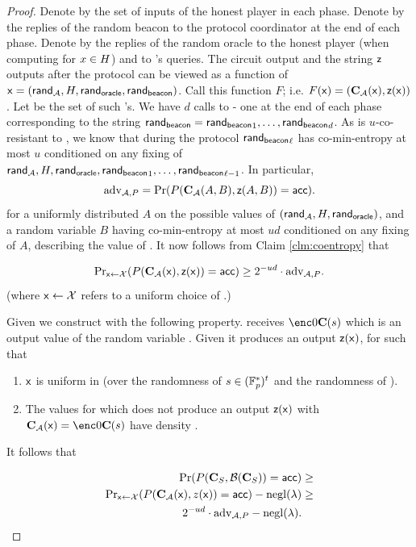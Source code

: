 \documentclass{article}
\begin{document}
\begin{proof}
Denote by \honestinputs the set of inputs of the honest player in each phase.
Denote by \beaconrand the replies of the random beacon to the protocol coordinator at the end of each phase.
Denote by \oraclerand the replies of the random oracle to the honest player (when computing  for $x\in H$) and to \adv 's queries.
The circuit output \protoutput and the string $\mathsf{z}$ \adv outputs after the protocol can be viewed as a function of $\mathsf{x}=(\mathsf{rand_{\mathcal{A}}},H,\mathsf{rand_{oracle}},\mathsf{rand_{beacon}})$.
Call this function $F$; i.e. $F(\mathsf{x}) = (\mathbf{C}_\mathcal{A}(\mathsf{x}),\mathsf{z}(\mathsf{x}))$.
Let \randdomain be the set of such \rand's.
We have $d$ calls to \RB - one at the end of each phase corresponding to the string $\mathsf{rand_{beacon}}= \mathsf{rand_{beacon}}_1,\ldots,\mathsf{rand_{beacon}}_d$. As \RB is $u$-co-resistant to \adv, we know that during the protocol
$\mathsf{rand_{beacon}}_\ell$ has co-min-entropy at most $u$ conditioned on any fixing of $\mathsf{rand_{\mathcal{A}}},H,\mathsf{rand_{oracle}},\mathsf{rand_{beacon}}_1,\ldots,\mathsf{rand_{beacon}}_{\ell-1}$.
In particular,
 \[\mathrm{adv}_{\mathcal{A},P} = \mathrm{Pr}(P(\mathbf{C}_\mathcal{A}(A,B),\mathsf{z}(A,B))=\mathsf{acc} ). \]
for a uniformly distributed $A$ on the possible values of $(\mathsf{rand_{\mathcal{A}}},H,\mathsf{rand_{oracle}})$, and  a random variable $B$ having co-min-entropy at most $ud$ conditioned on any fixing of $A$, describing the value of \beaconrand.
It now follows from Claim \ref{clm:coentropy} that
  
 \[\mathrm{Pr}_{\mathsf{x}\leftarrow \mathcal X}(P(\mathbf{C}_\mathcal{A}(\mathsf{x}),\mathsf{z}(\mathsf{x}))=\mathsf{acc} ) \geq  2^{-ud}\cdot \mathrm{adv}_{\mathcal{A},P}.\]
(where $\mathsf{x} \leftarrow\mathcal X$ refers to a uniform choice of \rand.)

 Given \adv we construct \advv with the following property. 
 \advv receives $\enc0{\circ(s)}$ which is an output value of the random variable \randoutput.
 Given  it produces an output $\mathsf{z}(\mathsf{x})$, for \rand such that 
 \begin{enumerate}	
  \item $\mathsf{x}$ is uniform in \randdomain (over the randomness of $s\in ({\mathbb F}_p^*)^t$ and the 	randomness of \advv).
 \item  The values \rand for which \advv does not produce an output $\mathsf{z}(\mathsf{x})$ with $\protoutput(\rand) = \enc0{\circ(s)}$ have density \negl.
 
 \end{enumerate}
It follows that 

\begin{align*}
\mathrm{Pr}(P(\mathbf{C}_S,{\cal B}(\mathbf{C}_S))=\mathsf{acc}) &\geq
\\ \mathrm{Pr}_{\mathsf{x}\leftarrow \mathcal X}(P(\mathbf{C}_\mathcal{A}(\mathsf{x}),z(\mathsf{x}))=\mathsf{acc} ) -\mathrm{negl}(\lambda) &\geq \\ 2^{-ud}\cdot \mathrm{adv}_{\mathcal{A},P}\allowbreak -\mathrm{negl}(\lambda).
\end{align*}



\end{proof}
\end{document}
